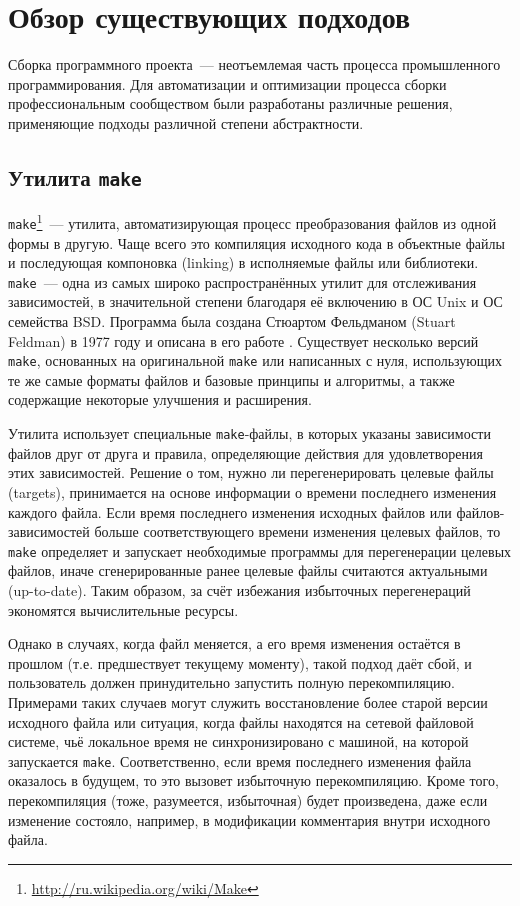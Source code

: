 \section{Обзор существующих подходов}

Сборка программного проекта~--- неотъемлемая часть процесса промышленного программирования. Для автоматизации и оптимизации процесса сборки профессиональным сообществом были разработаны различные решения, применяющие подходы различной степени абстрактности.

\subsection{Утилита \texttt{make}}
\texttt{make}\footnote{\url{http://ru.wikipedia.org/wiki/Make}}~--- утилита, автоматизирующая процесс преобразования файлов из одной формы в другую. Чаще всего это компиляция исходного кода в объектные файлы и последующая компоновка (linking) в исполняемые файлы или библиотеки. \texttt{make}~--- одна из самых широко распространённых утилит для отслеживания зависимостей, в значительной степени благодаря её включению в ОС Unix и ОС семейства BSD. Программа была создана Стюартом Фельдманом (Stuart Feldman) в 1977 году и описана в его работе \cite{feldman_make}. Существует несколько версий \texttt{make}, основанных на оригинальной \texttt{make} или написанных с нуля, использующих те же самые форматы файлов и базовые принципы и алгоритмы, а также содержащие некоторые улучшения и расширения.

Утилита использует специальные \texttt{make}-файлы, в которых указаны зависимости файлов друг от друга и правила, определяющие действия для удовлетворения этих зависимостей. Решение о том, нужно ли перегенерировать целевые файлы (targets), принимается на основе информации о времени последнего изменения каждого файла. Если время последнего изменения исходных файлов или файлов-зависимостей больше соответствующего времени изменения целевых файлов, то \texttt{make} определяет и запускает необходимые программы для перегенерации целевых файлов, иначе сгенерированные ранее целевые файлы считаются актуальными (up-to-date). Таким образом, за счёт избежания избыточных перегенераций экономятся вычислительные ресурсы.

Однако в случаях, когда файл меняется, а его время изменения остаётся в прошлом (т.е. предшествует текущему моменту), такой подход даёт сбой, и пользователь должен принудительно запустить полную перекомпиляцию. Примерами таких случаев могут служить восстановление более старой версии исходного файла или ситуация, когда файлы находятся на сетевой файловой системе, чьё локальное время не синхронизировано с машиной, на которой запускается \texttt{make}. Соответственно, если время последнего изменения файла оказалось в будущем, то это вызовет избыточную перекомпиляцию. Кроме того, перекомпиляция (тоже, разумеется, избыточная) будет произведена, даже если изменение состояло, например, в модификации комментария внутри исходного файла.

